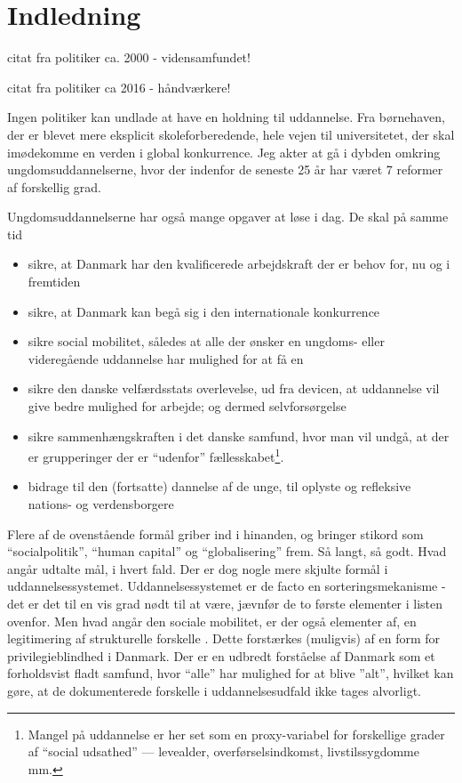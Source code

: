 \section{Indledning}

citat fra politiker ca. 2000 - vidensamfundet!

citat fra politiker ca 2016 - håndværkere!

Ingen politiker kan undlade at have en holdning til uddannelse.
Fra børnehaven, der er blevet mere eksplicit skoleforberedende, hele vejen til universitetet, der skal imødekomme en verden i global konkurrence.
Jeg akter at gå i dybden omkring ungdomsuddannelserne, hvor der indenfor de seneste 25 år har været 7 reformer af forskellig grad.

Ungdomsuddannelserne har også mange opgaver at løse i dag.
De skal på samme tid
\begin{itemize}
  \item
    sikre, at Danmark har den kvalificerede arbejdskraft der er behov for, nu og i fremtiden
  \item
    sikre, at Danmark kan begå sig i den internationale konkurrence
  \item
    sikre social mobilitet, således at alle der ønsker en ungdoms- eller videregående uddannelse har mulighed for at få en
  \item
    sikre den danske velfærdsstats overlevelse, ud fra devicen, at uddannelse vil give bedre mulighed for arbejde; og dermed selvforsørgelse 
  \item
    sikre sammenhængskraften i det danske samfund, hvor man vil undgå, at der er grupperinger der er “udenfor” fællesskabet\footnote{Mangel på uddannelse er her set som en proxy-variabel for forskellige grader af “social udsathed” — levealder, overførselsindkomst, livstilssygdomme mm.}.
  \item
    bidrage til den (fortsatte) dannelse af de unge, til oplyste og refleksive nations- og verdensborgere
\end{itemize}

Flere af de ovenstående formål griber ind i hinanden, og bringer stikord som “socialpolitik”, “human capital” og “globalisering” frem.
Så langt, så godt.
Hvad angår udtalte mål, i hvert fald.
Der er dog nogle mere skjulte formål i uddannelsessystemet.
Uddannelsessystemet er de facto en sorteringsmekanisme - det er det til en vis grad nødt til at være, jævnfør de to første elementer i listen ovenfor.
Men hvad angår den sociale mobilitet, er der også elementer af, en legitimering af strukturelle forskelle .
Dette forstærkes (muligvis) af en form for privilegieblindhed i Danmark.  
Der er en udbredt forståelse af Danmark som et forholdsvist fladt samfund, hvor “alle” har mulighed for at blive ”alt”, hvilket kan gøre, at de dokumenterede forskelle i uddannelsesudfald ikke tages alvorligt.

